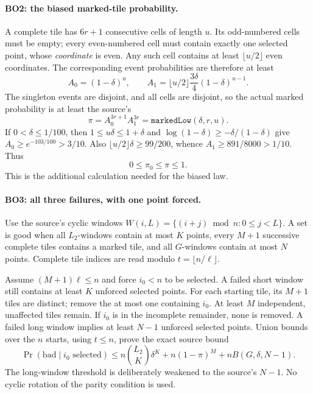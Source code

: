 \documentclass[11pt,a4paper]{article}
\numberwithin{equation}{section}
\theoremstyle{remark}\newtheorem{remark}[theorem]{Remark}
\begin{document}
\paragraph{BO2: the biased marked-tile probability.}
A complete tile has $6r+1$ consecutive cells of length $u$. Its
odd-numbered cells must be empty; every even-numbered cell must contain
exactly one selected point, whose \emph{coordinate} is even.
Any such cell contains at least $\lfloor u/2\rfloor$ even coordinates.
The corresponding event probabilities are therefore at least
\[
 A_0=(1-\delta)^u,\qquad
 A_1=\lfloor u/2\rfloor\frac{3\delta}{4}(1-\delta)^{u-1}.
\]
The singleton events are disjoint, and all cells are disjoint, so the
actual marked probability is at least the source's
\[
 \pi=A_0^{3r+1}A_1^{3r}=\texttt{markedLow}(\delta,r,u).
                                                               \tag{BO.3}
\]
If $0<\delta\le1/100$, then $1\le u\delta\le1+\delta$ and
$\log(1-\delta)\ge-\delta/(1-\delta)$ give
$A_0\ge e^{-103/100}>3/10$. Also
$\lfloor u/2\rfloor\delta\ge99/200$, whence
$A_1\ge891/8000>1/10$. Thus
\[
 0\le\pi_0\le\pi\le1.                                        \tag{BO.4}
\]
This is the additional calculation needed for the biased law.

\paragraph{BO3: all three failures, with one point forced.}
Use the source's cyclic windows
$W(i,L)=\{(i+j)\bmod n:0\le j<L\}$. A set is good when all
$L_2$-windows contain at most $K$ points, every $M+1$ successive
complete tiles contains a marked tile, and all $G$-windows contain at
most $N$ points. Complete tile indices are read modulo
$t=\lfloor n/\ell\rfloor$.

Assume $(M+1)\ell\le n$ and force $i_0<n$ to be selected. A failed
short window still contains at least $K$ unforced selected points.
For each starting tile, its $M+1$ tiles are distinct; remove the at most
one containing $i_0$. At least $M$ independent, unaffected tiles remain.
If $i_0$ is in the incomplete remainder, none is removed. A failed
long window implies at least $N-1$ unforced selected points. Union bounds
over the $n$ starts, using $t\le n$, prove the exact source bound
\[
 \Pr(\mathrm{bad}\mid i_0\text{ selected})\le
 n\binom{L_2}{K}\delta^K+n(1-\pi)^M+nB(G,\delta,N-1).
                                                               \tag{BO.5}
\]
The long-window threshold is deliberately weakened to the source's
$N-1$. No cyclic rotation of the parity condition is used.
\end{document}
